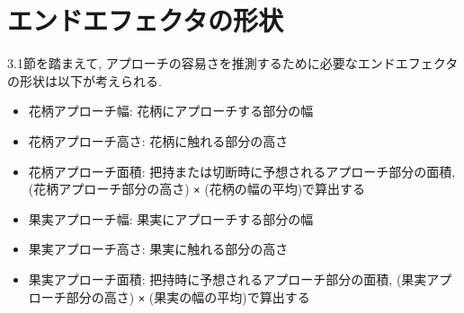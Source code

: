 \section{エンドエフェクタの形状}
3.1節を踏まえて, アプローチの容易さを推測するために必要なエンドエフェクタの形状は以下が考えられる.

\begin{itemize}
  \item 花柄アプローチ幅: 花柄にアプローチする部分の幅
  \item 花柄アプローチ高さ: 花柄に触れる部分の高さ
  \item 花柄アプローチ面積: 把持または切断時に予想されるアプローチ部分の面積, (花柄アプローチ部分の高さ) \verb|×| (花柄の幅の平均)で算出する
  \item 果実アプローチ幅: 果実にアプローチする部分の幅
  \item 果実アプローチ高さ: 果実に触れる部分の高さ
  \item 果実アプローチ面積: 把持時に予想されるアプローチ部分の面積, (果実アプローチ部分の高さ) \verb|×| (果実の幅の平均)で算出する
\end{itemize}
